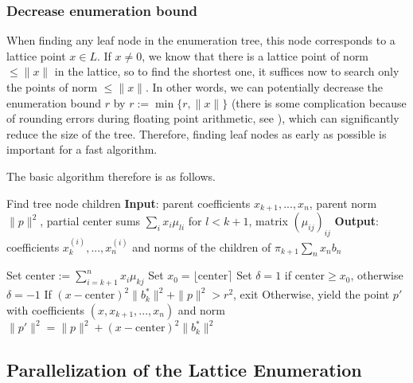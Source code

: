 \documentclass{scrartcl}
\begin{document}
    \subsubsection*{Decrease enumeration bound}

    \label{sec:enum_bound}
    When finding any leaf node in the enumeration tree, this node corresponds to a lattice point $x \in L$. If $x \neq 0$, we know that there is a lattice point of norm $\leq \|x\|$ in the lattice, so to find the shortest one, it suffices now to search only the points of norm $\leq \|x\|$. In other words, we can potentially decrease the enumeration bound $r$ by $r := \min \{ r, \|x\| \}$ (there is some complication because of rounding errors during floating point arithmetic, see \cite{enum_numerics}), which can significantly reduce the size of the tree. Therefore, finding leaf nodes as early as possible is important for a fast algorithm.

    The basic algorithm therefore is as follows.

    \begin{algorithm}[H]
        \caption{
            Find tree node children \label{alg:children_iter}
            \newline
            \textbf{Input}: parent coefficients $x_{k + 1}, ..., x_n$, parent norm $\|p\|^2$, partial center sums $\sum_i x_i \mu_{li}$ for $l < k + 1$, matrix $(\mu_{ij})_{ij}$
            \newline
            \textbf{Output}: coefficients $x^{(i)}_k, ..., x^{(i)}_n$ and norms of the children of $\pi_{k + 1} \sum_n x_n b_n$
        }
        \begin{algorithmic}
            \STATE Set $\mathrm{center} := \sum_{i = k + 1}^n x_i \mu_{kj}$
            \STATE Set $x_0 = \lfloor \mathrm{center} \rceil$
            \STATE Set $\delta = 1$ if $\mathrm{center} \geq x_0$, otherwise $\delta = -1$
                \STATE If $(x - \mathrm{center})^2 \| b^*_k \|^2 + \| p \|^2 > r^2$, exit
                \STATE Otherwise, yield the point $p'$ with coefficients $(x, x_{k + 1}, ..., x_n)$ and norm $\|p'\|^2 = \|p\|^2 + (x - \mathrm{center})^2 \|b_k^*\|^2$
            \ENDFOR
        \end{algorithmic}
    \end{algorithm}

    \subsection{Parallelization of the Lattice Enumeration}
\end{document}
